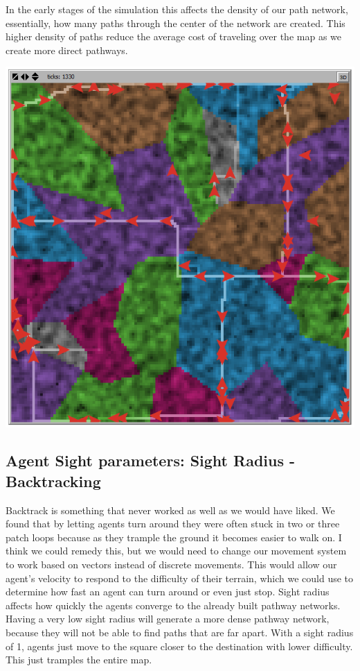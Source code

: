 \documentclass[conference]{IEEEtran}
\begin{document}
	In the early stages of the simulation this affects the density of our path network, essentially, how many paths through the center of the network are created. This higher density of paths reduce the average cost of traveling over the map as we create more direct pathways.

\includegraphics[scale=0.25]{image/results5}

\subsection{Agent Sight parameters: Sight Radius - Backtracking}
Backtrack is something that never worked as well as we would have liked. We found that by letting agents turn around they were often stuck in two or three patch loops because as they trample the ground it becomes easier to walk on. I think we could remedy this, but we would need to change our movement system to work based on vectors instead of discrete movements. This would allow our agent’s velocity to respond to the difficulty of their terrain, which we could use to determine how fast an agent can turn around or even just stop. 
Sight radius affects how quickly the agents converge to the already built pathway networks. Having a very low sight radius will generate a more dense pathway network, because they will not be able to find paths that are far apart. With a sight radius of 1, agents just move to the square closer to the destination with lower difficulty. This just tramples the entire map.
\end{document}
